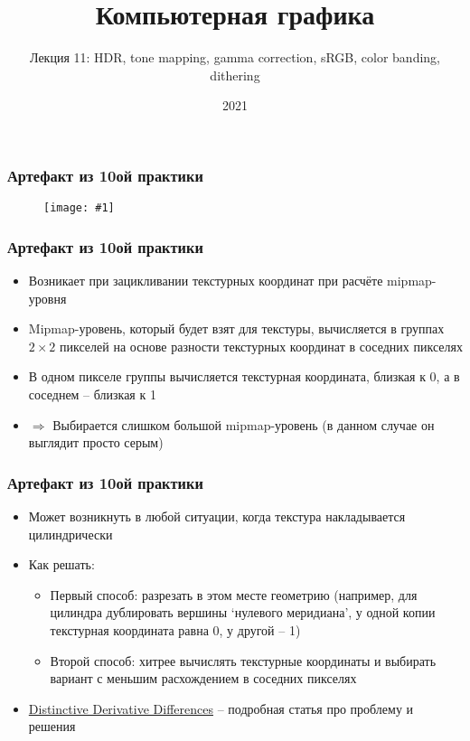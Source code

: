 \documentclass{beamer}
\title{Компьютерная графика}
\subtitle{Лекция 11: HDR, tone mapping, gamma correction, sRGB, color banding, dithering}
\date{2021}
\newcommand{\slideimage}[1]{
  \begin{figure}
    \begin{adjustbox}{width=\textwidth, totalheight=\textheight-2\baselineskip-2\baselineskip,keepaspectratio}
      \texttt{[image: \#1]}
    \end{adjustbox}
  \end{figure}
}
\begin{document}
\frame{\titlepage}

\begin{frame}[fragile]
\frametitle{Артефакт из 10ой практики}
\slideimage{practice10_bug.png}
\end{frame}

\begin{frame}[fragile]
\frametitle{Артефакт из 10ой практики}
\begin{itemize}
\item Возникает при зацикливании текстурных координат при расчёте mipmap-уровня
\pause
\item Mipmap-уровень, который будет взят для текстуры, вычисляется в группах \begin{math}2\times 2\end{math} пикселей на основе разности текстурных координат в соседних пикселях
\pause
\item В одном пикселе группы вычисляется текстурная координата, близкая к 0, а в соседнем -- близкая к 1
\pause
\item \begin{math}\Rightarrow\end{math} Выбирается слишком большой mipmap-уровень (в данном случае он выглядит просто серым)
\end{itemize}
\end{frame}

\begin{frame}[fragile]
\frametitle{Артефакт из 10ой практики}
\begin{itemize}
\item Может возникнуть в любой ситуации, когда текстура накладывается цилиндрически
\pause
\item Как решать:
\pause
\begin{itemize}
\item Первый способ: разрезать в этом месте геометрию (например, для цилиндра дублировать вершины `нулевого меридиана', у одной копии текстурная координата равна 0, у другой -- 1)
\item Второй способ: хитрее вычислять текстурные координаты и выбирать вариант с меньшим расхождением в соседних пикселях
\end{itemize}
\pause
\item \href{https://bgolus.medium.com/distinctive-derivative-differences-cce38d36797b}{Distinctive Derivative Differences} -- подробная статья про проблему и решения
\end{itemize}
\end{frame}
\end{document}
